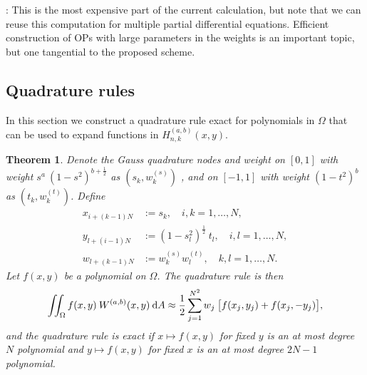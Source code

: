 \documentclass[11pt, oneside]{article}   	%
\newcommand{\half}{\frac{1}{2}}
\newcommand{\hdop}{H}
\newcommand{\hdopnkab}{\hdop_{n,k}^{(a,b)}}
\newcommand{\Wab}{{W^{(a,b)}}}
\newtheorem{theorem}{Theorem}
\begin{document}
: 
This is the most expensive part of the current calculation, but note that we can reuse this computation for multiple partial differential equations. Efficient construction of OPs with large parameters in the weights is an important topic, but one tangential to the proposed scheme. 

\subsection{Quadrature rules}

In this section we construct a quadrature rule exact for polynomials in $\Omega$ that can be used to expand functions in $\hdopnkab(x,y)$. 

\begin{theorem}

Denote the  Gauss quadrature nodes and weight on \([0,1]\) with weight \(s^a \: (1-s^2)^{b+\half}\) as $(s_k,w_k^{(s)})$ , and
 on \([-1,1]\) with weight \((1-t^2)^b\) as $(t_k,w_k^{(t)})$. Define
\begin{align*}
x_{i+(k-1)N} &:= s_k, \quad i,k = 1,\dots,N, \\
y_{l+(i-1)N} &:= (1-s_l^2)^\half \: t_l, \quad i,l = 1,\dots,N, \\
w_{l+(k-1)N} &:= w_k^{(s)} w_l^{(t)}, \quad k,l = 1,\dots,N.
\end{align*}
Let $f(x,y)$ be a polynomial on $\Omega$. The quadrature rule is then
$$
\iint_\Omega f(x,y) \: \Wab(x,y) \: \D A \approx \half \sum_{j=1}^{N^2} w_j \: \big[ f(x_j, y_j) + f(x_j, -y_j) \big],
$$
and the quadrature rule is exact if $x \mapsto f(x,y)$ for fixed $y$ is an at most degree $N$ polynomial and $y \mapsto f(x,y)$ for fixed $x$ is an at most degree $2N-1$ polynomial.
\end{theorem}
\end{document}
